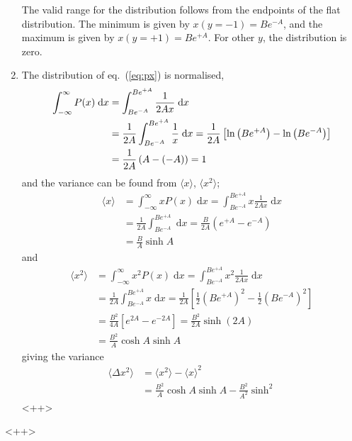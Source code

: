 \documentclass[a4paper,11pt]{article}
\newcommand{\diff}{\ensuremath{\; \text{d}}}
\begin{document}
\begin{enumerate}
        The valid range for the distribution follows from the endpoints of the flat distribution. The minimum is given by $x(y=-1) = Be^{-A}$, and the maximum is given by $x(y=+1) = Be^{+A}$. For other $y$, the distribution is zero.

    \item The distribution of eq.~(\ref{eq:px}) is normalised,
        \begin{align*}
            \int_{-\infty}^{\infty} P(x) \diff x &= \int_{Be^{-A}}^{Be^{+A}} \frac{1}{2Ax} \diff x \notag \\
            &=  \frac{1}{2A}\int_{Be^{-A}}^{Be^{+A}} \frac{1}{x} \diff x = \frac{1}{2A} \left[ \ln \left( Be^{+A} \right) - \ln \left( Be^{-A} \right) \right] \notag \\
            &=  \frac{1}{2A} \left( A - (-A) \right) = 1
        \end{align*}
        and the variance can be found from $\langle x \rangle$, $\langle x^2 \rangle$;
        \begin{align*}
            \langle x \rangle &= \int_{-\infty}^{\infty} x P(x) \diff x = \int_{Be^{-A}}^{Be^{+A}} x \frac{1}{2Ax} \diff x \\
            &=\frac{1}{2A}\int_{Be^{-A}}^{Be^{+A}} \diff x = \frac{B}{2A} \left( e^{+A} - e^{-A}  \right) \\
            &= \frac{B}{A} \sinh A
        \end{align*}
        and
        \begin{align*}
            \langle x^2 \rangle &= \int_{-\infty}^{\infty} x^2 P(x) \diff x = \int_{Be^{-A}}^{Be^{+A}} x^2 \frac{1}{2Ax} \diff x \\
            &=\frac{1}{2A}\int_{Be^{-A}}^{Be^{+A}} x \diff x = \frac{1}{2A} \left[ \frac{1}{2} (Be^{+A})^2 - \frac{1}{2}(Be^{-A})^2  \right] \\
            &= \frac{B^2}{4A} \left[ e^{2A} - e^{-2A} \right] = \frac{B^2}{2A} \sinh \left( 2A \right) \\
            &= \frac{B^2}{A} \cosh A \sinh A
        \end{align*}
        giving the variance
        \begin{align}
        \langle \Delta x^2 \rangle &= \langle x^2 \rangle - \langle x \rangle^2 \\
        &= \frac{B^2}{A} \cosh A \sinh A - \frac{B^2}{A^2} \sinh^2
            \label{<++>}
        \end{align}<++>


\end{enumerate}<++>
\end{document}
